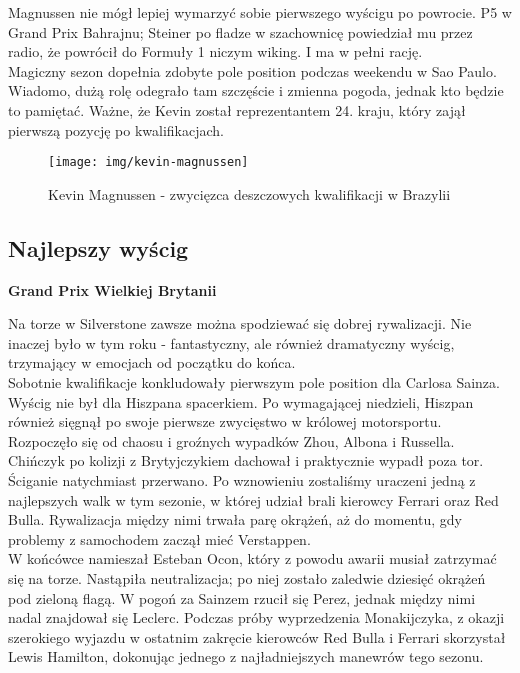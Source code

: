 \documentclass[12pt]{article}
\begin{document}
        Magnussen nie mógł lepiej wymarzyć sobie pierwszego wyścigu po powrocie. P5 w Grand Prix Bahrajnu; Steiner po fladze w szachownicę powiedział mu przez radio, że powrócił do Formuły 1 niczym wiking. I ma w pełni rację.\\
        
        Magiczny sezon dopełnia zdobyte pole position podczas weekendu w Sao Paulo. Wiadomo, dużą rolę odegrało tam szczęście i zmienna pogoda, jednak kto będzie to pamiętać. Ważne, że Kevin został reprezentantem 24. kraju, który zajął pierwszą pozycję po kwalifikacjach.\\

        \begin{figure}[ht]
            \centering
            \texttt{[image: img/kevin-magnussen]}
            \caption{Kevin Magnussen - zwycięzca deszczowych kwalifikacji w Brazylii}
            \label{fig:magnussen}
        \end{figure}

    \newpage
    \subsection{Najlepszy wyścig}
        \begin{center}
            \Huge \textbf{Grand Prix Wielkiej Brytanii}
        \end{center}

        Na torze w Silverstone zawsze można spodziewać się dobrej rywalizacji. Nie inaczej było w tym roku - fantastyczny, ale również dramatyczny wyścig, trzymający w emocjach od początku do końca.\\

        Sobotnie kwalifikacje konkludowały pierwszym pole position dla Carlosa Sainza. Wyścig nie był dla Hiszpana spacerkiem. Po wymagającej niedzieli, Hiszpan również sięgnął po swoje pierwsze zwycięstwo w królowej motorsportu.\\
        
        Rozpoczęło się od chaosu i groźnych wypadków Zhou, Albona i Russella. Chińczyk po kolizji z Brytyjczykiem dachował i praktycznie wypadł poza tor. Ściganie natychmiast przerwano. Po wznowieniu zostaliśmy uraczeni jedną z najlepszych walk w tym sezonie, w której udział brali kierowcy Ferrari oraz Red Bulla. Rywalizacja między nimi trwała parę okrążeń, aż do momentu, gdy problemy z samochodem zaczął mieć Verstappen.\\
        
        W końcówce namieszał Esteban Ocon, który z powodu awarii musiał zatrzymać się na torze. Nastąpiła neutralizacja; po niej zostało zaledwie dziesięć okrążeń pod zieloną flagą. W pogoń za Sainzem rzucił się Perez, jednak między nimi nadal znajdował się Leclerc. Podczas próby wyprzedzenia Monakijczyka, z okazji szerokiego wyjazdu w ostatnim zakręcie kierowców Red Bulla i Ferrari skorzystał Lewis Hamilton, dokonując jednego z najładniejszych manewrów tego sezonu. 
\end{document}
